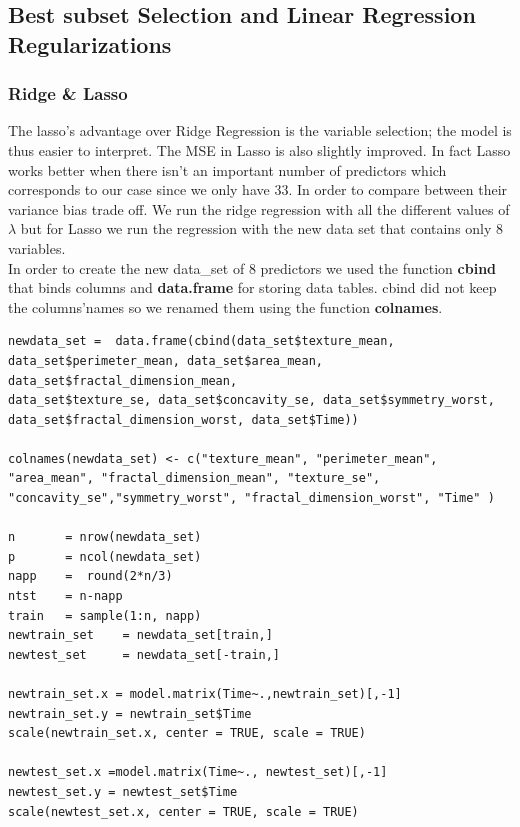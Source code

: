 \documentclass[]{report}
\begin{document}
\subsection{Best subset Selection and Linear Regression Regularizations}
\subsubsection{Ridge \& Lasso }
The lasso's advantage over Ridge Regression is the variable selection; the model is thus easier to interpret. The MSE in Lasso is also slightly improved. In fact Lasso works better when there isn't an important number of predictors which corresponds to our case since we only have 33. In order to compare between their variance bias trade off. We run the ridge regression with all the different values of $\lambda$ but for Lasso we run the regression with the new data set that contains only 8 variables.\\ 
In order to create the new data\_set of 8 predictors we used the function \textbf{cbind} that binds columns and \textbf{data.frame} for storing data tables. cbind did not keep the columns'names so we renamed them using the function \textbf{colnames}.

\begin{lstlisting}
newdata_set =  data.frame(cbind(data_set$texture_mean, data_set$perimeter_mean, data_set$area_mean, 
data_set$fractal_dimension_mean,
data_set$texture_se, data_set$concavity_se, data_set$symmetry_worst, 
data_set$fractal_dimension_worst, data_set$Time))

colnames(newdata_set) <- c("texture_mean", "perimeter_mean", "area_mean", "fractal_dimension_mean", "texture_se",
"concavity_se","symmetry_worst", "fractal_dimension_worst", "Time" )

n 		= nrow(newdata_set)
p 		= ncol(newdata_set)
napp 	=  round(2*n/3)
ntst 	= n-napp
train 	= sample(1:n, napp)
newtrain_set 	= newdata_set[train,]
newtest_set 	= newdata_set[-train,]

newtrain_set.x = model.matrix(Time~.,newtrain_set)[,-1] 
newtrain_set.y = newtrain_set$Time
scale(newtrain_set.x, center = TRUE, scale = TRUE)

newtest_set.x =model.matrix(Time~., newtest_set)[,-1]
newtest_set.y = newtest_set$Time
scale(newtest_set.x, center = TRUE, scale = TRUE)
\end{lstlisting}
\end{document}
